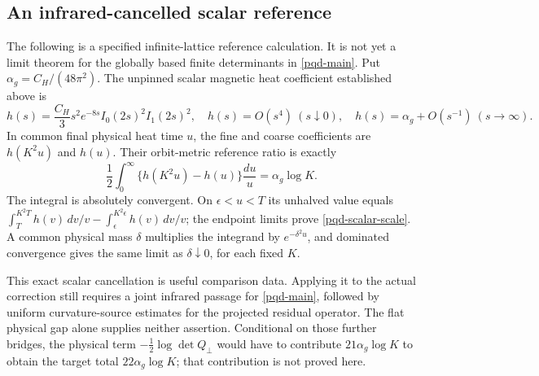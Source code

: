 \subsection{An infrared-cancelled scalar reference}
\label{pqd-scalar-reference-section}

The following is a specified infinite-lattice reference calculation.
It is not yet a limit theorem for the globally based finite determinants
in \eqref{pqd-main}. Put $\alpha_g=C_H/(48\pi^2)$. The unpinned scalar
magnetic heat coefficient established above is
\begin{equation}
 h(s)=\frac{C_H}{3}s^2e^{-8s}I_0(2s)^2I_1(2s)^2,
 \quad h(s)=O(s^4)\ (s\downarrow0),\quad
 h(s)=\alpha_g+O(s^{-1})\ (s\to\infty).
 \label{pqd-scalar-heat}
\end{equation}
In common final physical heat time $u$, the fine and coarse coefficients
are $h(K^2u)$ and $h(u)$. Their orbit-metric reference ratio is exactly
\begin{equation}
 \frac12\int_0^\infty\{h(K^2u)-h(u)\}\frac{du}{u}
                       =\alpha_g\log K.
 \label{pqd-scalar-scale}
\end{equation}
The integral is absolutely convergent. On $\epsilon<u<T$ its unhalved
value equals
$\int_T^{K^2T}h(v)\,dv/v-\int_\epsilon^{K^2\epsilon}h(v)\,dv/v$;
the endpoint limits prove \eqref{pqd-scalar-scale}. A common physical
mass $\delta$ multiplies the integrand by $e^{-\delta^2u}$, and dominated
convergence gives the same limit as $\delta\downarrow0$, for each
fixed $K$.

This exact scalar cancellation is useful comparison data. Applying it
to the actual correction still requires a joint infrared passage for
\eqref{pqd-main}, followed by uniform curvature-source estimates for the
projected residual operator. The flat physical gap alone supplies
neither assertion. Conditional on those further bridges, the physical
term $-\frac12\log\det Q_\perp$ would have to contribute
$21\alpha_g\log K$ to obtain the target total
$22\alpha_g\log K$; that contribution is not proved here.

